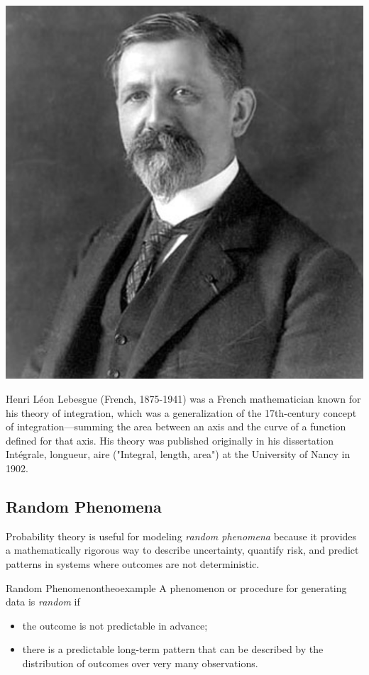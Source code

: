 \documentclass{tufte-handout}
\begin{document}
 \begin{marginfigure}
\includegraphics{fig/Lebesgue.png}
\caption{Henri Léon Lebesgue (French, 1875-1941) was a French mathematician known for his theory of integration, which was a generalization of the 17th-century concept of integration—summing the area between an axis and the curve of a function defined for that axis. His theory was published originally in his dissertation Intégrale, longueur, aire ("Integral, length, area") at the University of Nancy in 1902.}
\end{marginfigure}

\subsection{Random Phenomena}
Probability theory is useful for modeling \textit{random phenomena} because it provides a mathematically rigorous way to describe uncertainty, quantify risk, and predict patterns in systems where outcomes are not deterministic.
\begin{mydef}{Random Phenomenon}{theoexample}
A phenomenon or procedure for generating data is \textit{random} if
\begin{itemize}
\item the outcome is not predictable in advance;
\item there is a predictable  long-term pattern that can be described by the distribution
of outcomes over very many observations.
\end{itemize}

\end{mydef}
\end{document}
